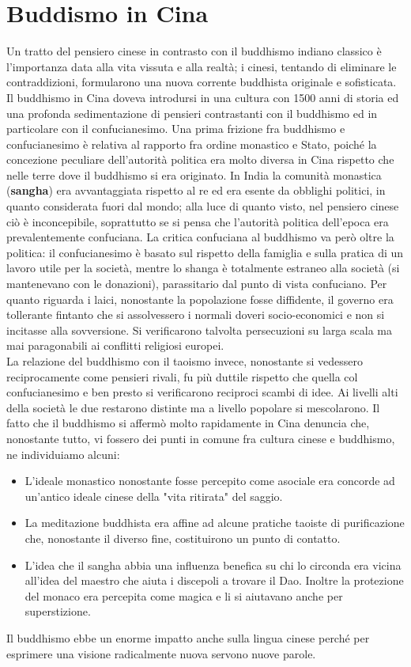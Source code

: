 \documentclass[10pt,a4paper]{report}
\begin{document}
\section{Buddismo in Cina}
Un tratto del pensiero cinese in contrasto con il buddhismo indiano classico è l'importanza data alla vita vissuta e alla realtà; i cinesi, tentando di eliminare le contraddizioni, formularono una nuova corrente buddhista originale e sofisticata. Il buddhismo in Cina doveva introdursi in una cultura con 1500 anni di storia ed una profonda sedimentazione di pensieri contrastanti con il buddhismo ed in particolare con il confucianesimo. Una prima frizione fra buddhismo e confucianesimo è relativa al rapporto fra ordine monastico e Stato, poiché la concezione peculiare dell'autorità politica era molto diversa in Cina rispetto che nelle terre dove il buddhismo si era originato. In India la comunità monastica (\textbf{sangha}) era avvantaggiata rispetto al re ed era esente da obblighi politici, in quanto considerata fuori dal mondo; alla luce di quanto visto, nel pensiero cinese ciò è inconcepibile, soprattutto se si pensa che l'autorità politica dell'epoca era prevalentemente confuciana. La critica confuciana al buddhismo va però oltre la politica: il confucianesimo è basato sul rispetto della famiglia e sulla pratica di un lavoro utile per la società, mentre lo shanga è totalmente estraneo alla società (si mantenevano con le donazioni), parassitario dal punto di vista confuciano. Per  quanto riguarda i laici, nonostante la popolazione fosse diffidente, il governo era tollerante fintanto che si assolvessero i normali doveri socio-economici e non si incitasse alla sovversione. Si verificarono talvolta persecuzioni su larga scala ma mai paragonabili ai conflitti religiosi europei.\\
La relazione del buddhismo con il taoismo invece, nonostante si vedessero reciprocamente come pensieri rivali, fu più duttile rispetto che quella col confucianesimo e ben presto si verificarono reciproci scambi di idee. Ai livelli alti della società le due restarono distinte ma a livello popolare si mescolarono. Il fatto che il buddhismo si affermò molto rapidamente in Cina denuncia che, nonostante tutto, vi fossero dei punti in comune fra cultura cinese e buddhismo, ne individuiamo alcuni:
\begin{itemize}
	\item L'ideale monastico nonostante fosse percepito come asociale era concorde ad un'antico ideale cinese della "vita ritirata" del saggio.
	\item La meditazione buddhista era affine ad alcune pratiche taoiste di purificazione che, nonostante il diverso fine, costituirono un punto di contatto.
	\item L'idea che il sangha abbia una influenza benefica su chi lo circonda era vicina all'idea del maestro che aiuta i discepoli a trovare il Dao. Inoltre la protezione del monaco era percepita come magica e li si aiutavano anche per superstizione.
\end{itemize}
Il buddhismo ebbe un enorme impatto anche sulla lingua cinese perché per esprimere una visione radicalmente nuova servono nuove parole.
\end{document}
